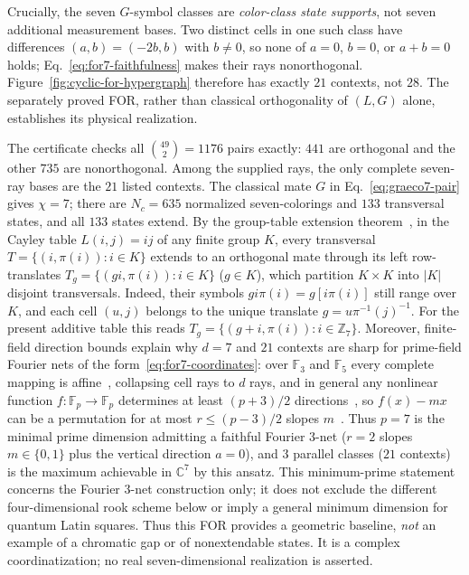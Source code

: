 \documentclass[aps,pra,reprint,superscriptaddress,longbibliography,nofootinbib,floatfix,10pt]{revtex4-2}
\theoremstyle{definition}\newtheorem{definition}[theorem]{Definition}
\theoremstyle{remark}\newtheorem{remark}[theorem]{Remark}
\begin{document}
Crucially, the seven $G$-symbol classes are \emph{color-class state supports}, not seven additional measurement bases. Two distinct cells in one such class have differences $(a,b)=(-2b,b)$ with $b\ne0$, so none of $a=0$, $b=0$, or $a+b=0$ holds; Eq.~\eqref{eq:for7-faithfulness} makes their rays nonorthogonal. Figure~\ref{fig:cyclic-for-hypergraph} therefore has exactly $21$ contexts, not $28$. The separately proved FOR, rather than classical orthogonality of $(L,G)$ alone, establishes its physical realization.

The certificate checks all $\binom{49}{2}=1176$ pairs exactly: $441$ are orthogonal and the other $735$ are nonorthogonal. Among the supplied rays, the only complete seven-ray bases are the $21$ listed contexts. The classical mate $G$ in Eq.~\eqref{eq:graeco7-pair} gives $\chi=7$; there are $N_c=635$ normalized seven-colorings and $133$ transversal states, and all $133$ states extend. By the group-table extension theorem~\cite{mann1942construction,wanless2011transversals}, in the Cayley table $L(i,j)=ij$ of any finite group $K$, every transversal $T=\{(i,\pi(i)):i\in K\}$ extends to an orthogonal mate through its left row-translates $T_g=\{(gi,\pi(i)):i\in K\}$ ($g\in K$), which partition $K\times K$ into $|K|$ disjoint transversals. Indeed, their symbols $gi\pi(i)=g[i\pi(i)]$ still range over $K$, and each cell $(u,j)$ belongs to the unique translate $g=u\pi^{-1}(j)^{-1}$. For the present additive table this reads $T_g=\{(g+i,\pi(i)):i\in\mathbb Z_7\}$. Moreover, finite-field direction bounds explain why $d=7$ and $21$ contexts are sharp for prime-field Fourier nets of the form~\eqref{eq:for7-coordinates}: over $\mathbb F_3$ and $\mathbb F_5$ every complete mapping is affine~\cite{niederreiter1982complete}, collapsing cell rays to $d$ rays, and in general any nonlinear function $f:\mathbb F_p\to\mathbb F_p$ determines at least $(p+3)/2$ directions~\cite{lovasz1983redei,ball2003directions}, so $f(x)-mx$ can be a permutation for at most $r\le(p-3)/2$ slopes $m$~\cite{evans1992linearized}. Thus $p=7$ is the minimal prime dimension admitting a faithful Fourier $3$-net ($r=2$ slopes $m\in\{0,1\}$ plus the vertical direction $a=0$), and $3$ parallel classes ($21$ contexts) is the maximum achievable in $\mathbb C^7$ by this ansatz. This minimum-prime statement concerns the Fourier $3$-net construction only; it does not exclude the different four-dimensional rook scheme below or imply a general minimum dimension for quantum Latin squares. Thus this FOR provides a geometric baseline, \emph{not} an example of a chromatic gap or of nonextendable states. It is a complex coordinatization; no real seven-dimensional realization is asserted.
\end{document}
